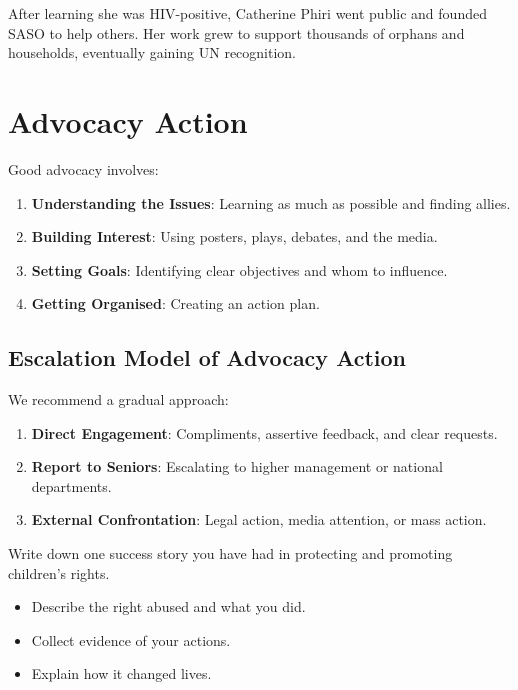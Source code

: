\documentclass[12pt,a4paper]{article}
\begin{document}
\begin{tcolorbox}[title=Catherine’s Story (Malawi)]
After learning she was HIV-positive, Catherine Phiri went public and founded SASO to help others. Her work grew to support thousands of orphans and households, eventually gaining UN recognition.
\end{tcolorbox}

\section*{Advocacy Action}
Good advocacy involves:
\begin{enumerate}
    \item \textbf{Understanding the Issues}: Learning as much as possible and finding allies.
    \item \textbf{Building Interest}: Using posters, plays, debates, and the media.
    \item \textbf{Setting Goals}: Identifying clear objectives and whom to influence.
    \item \textbf{Getting Organised}: Creating an action plan.
\end{enumerate}

\subsection*{Escalation Model of Advocacy Action}
We recommend a gradual approach:
\begin{enumerate}
    \item \textbf{Direct Engagement}: Compliments, assertive feedback, and clear requests.
    \item \textbf{Report to Seniors}: Escalating to higher management or national departments.
    \item \textbf{External Confrontation}: Legal action, media attention, or mass action.
\end{enumerate}

\begin{tcolorbox}[colback=orange!5,colframe=orange!75!black,title=Learning Activity 4.6: Write Your Own Success Story]
Write down one success story you have had in protecting and promoting children’s rights. 
\begin{itemize}
    \item Describe the right abused and what you did.
    \item Collect evidence of your actions.
    \item Explain how it changed lives.
\end{itemize}
\end{tcolorbox}
\end{document}
